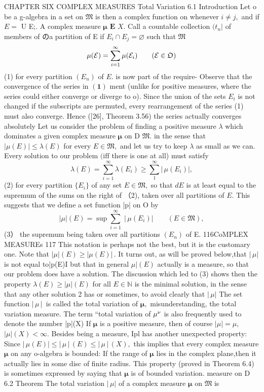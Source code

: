 CHAPTER SIX COMPLEX MEASURES Total Variation 6.1 Introduction Let o be a g-algebra in a set on ${\mathfrak{M}}$ is then a complex function on whenever $i\neq j,$ and if $\scriptstyle{E=}$ U E;. A complex measure ${\boldsymbol{\mu}}$ $\boldsymbol{E}$ $X.$ Call a countable collection $(t_{n}|$ of members of のa partition of E if $E_{i}\cap E_{j}=\varnothing$ such that ${\mathfrak{M}}$ $$ \mu({\cal E})=\sum_{i=1}^{\infty}\mu({\cal E}_{i})\qquad({\cal E}\in\mathfrak{O}) $$ (1) for every partition $(E_{n})$ of $\textstyle E.$ is now part of the require- Observe that the convergence of the series in $\mathbf{(1)}$ ment (unlike for positive measures, where the series could either converge or diverge to o). Since the union of the sets $\textstyle E_{i}$ is not changed if the subscripts are permuted, every rearrangement of the series (1) must also converge. Hence ([26], Theorem 3.56) the series actually converges absolutely Let us consider the problem of finding a positive measure $\lambda$ which dominates a given complex measure ${\boldsymbol{\mu}}$ on D ${\mathfrak{M}}.$ in the sense that $|\mu(E)|\leq\lambda(E)$ for every $E\in{\mathfrak{M}},$ and let us try to keep $\lambda$ as small as we can. Every solution to our problem $(\mathrm{iff}$ there is one at all) must satisfy $$ \lambda(E)=\sum_{i=1}^{\infty}\lambda(E_{i})\geq\sum_{1}^{\infty}\left|\,\mu(E_{i})\right|, $$ (2) for every partition $\{E_{i}\}$ of any set $E\in{\mathfrak{M}},$ so that $\scriptstyle{d E}$ is at least equal to the supremum of the sums on the right of （2), taken over all partitions of $\textstyle E.$ This suggests that we define a set function |p| on O by $$ |\mu|(E)=\operatorname*{sup}\sum_{i=1}^{\infty}\;|\,\mu(E_{i})|\qquad(E\in{\mathfrak{M}}), $$ (3） the supremum being taken over all partitions $(E_{n})$ of E. 116CoMPLEX MEASUREs 117 This notation is perhaps not the best, but it is the customary one. Note that $|\mu|(E)\geq|\mu(E)|\,.$ It turns out, as will be proved below,that $\left|\,\mu\right|$ is not equal to|p(E)I but that in general $\mu|(E)$ actually is a measure, so that our problem does have a solution. The discussion which led to (3) shows then the property $\lambda(E)\geq\left|\mu\right|(E)$ for all $\scriptstyle E\in\mathbb{N}$ is the minimal solution, in the sense that any other solution 2 has or sometimes, to avoid clearly that $\left|\,\mu\right|$ The set function $|\,\mu\,|\,$ is called the total variation of ${\boldsymbol{\mu}},$ misunderstanding, the total variation measure. The term “total variation of $\mu^{\nu}\/$ is also frequently used to denote the number |p|(X) If ${\boldsymbol{\mu}}$ is a positive measure, then of course $|\mu|=\mu,$ $|\mu|(X)<\infty.$ Besides being a measure, Ipl has another unexpected property: Since $|\,\mu(E)|\leq|\,\mu\,|\,(E)\leq|\,\mu\,|\,(X),$ this implies that every complex measure ${\boldsymbol{\mu}}$ on any o-algebra is bounded: If the range of ${\boldsymbol{\mu}}$ lies in the complex plane,then it actually lies in some disc of finite radius. This property (proved in Theorem 6.4) is sometimes expressed by saying that $\boldsymbol{\mu}$ is of bounded variation. measure on D 6.2 Theorem The total variation $\left|\,\mu\right|$ of a complex measure $\boldsymbol{\mu}$ on ${\mathfrak{M}}$ is 
